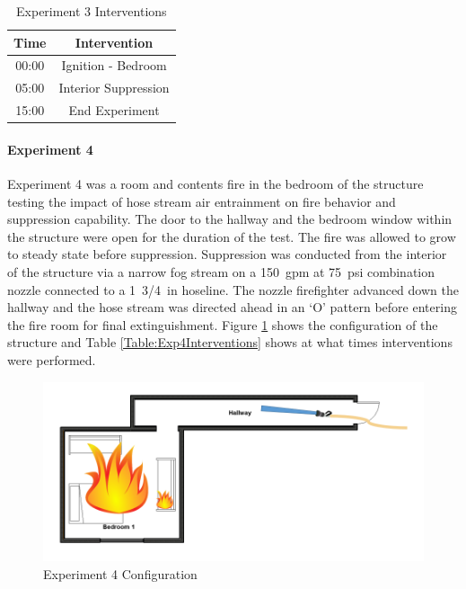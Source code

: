 \documentclass[12pt,oneside]{book}
\begin{document}
\begin{table}[H]
	\centering
	\caption{Experiment 3 Interventions}
	\begin{tabular}{|c|c|} 
		\hline
		Time & Intervention \\ \hline \hline
		00:00 & Ignition - Bedroom \\ \hline
		05:00 & Interior Suppression \\ \hline
		15:00 & End Experiment\\ \hline
	\end{tabular}
	\label{Table:Exp3Interventions}
\end{table}

\clearpage

\paragraph{Experiment 4} \mbox{}

Experiment 4 was a room and contents fire in the bedroom of the structure testing the impact of hose stream air entrainment on fire behavior and suppression capability. The door to the hallway and the bedroom window within the structure were open for the duration of the test. The fire was allowed to grow to steady state before suppression. Suppression was conducted from the interior of the structure via a narrow fog stream on a 150~gpm at 75~psi combination nozzle connected to a 1~3/4~in hoseline. The nozzle firefighter advanced down the hallway and the hose stream was directed ahead in an `O' pattern before entering the fire room for final extinguishment. Figure \ref{fig:Exp4Config} shows the configuration of the structure and Table \ref{Table:Exp4Interventions} shows at what times interventions were performed. 


\begin{figure}[H]
	\centering
	\includegraphics[width=5in]{Howard_Exp_4.png}
	\caption{Experiment 4 Configuration}
	\label{fig:Exp4Config}
\end{figure}
\end{document}
